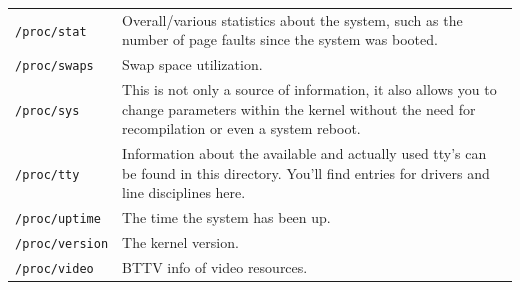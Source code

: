 \documentclass[a4paper]{article}
\begin{document}
\begin{table}
\begin{tabular}{@{}lp{8cm}@{}}
\texttt{/proc/stat} &
Overall/various statistics about the system, such as the number of page faults since the system was booted.\\

\texttt{/proc/swaps} &
Swap space utilization.\\

\texttt{/proc/sys} &
This is not only a source of information, it also allows you to change parameters within the kernel without the need for recompilation or even a system reboot.\\

\texttt{/proc/tty} &
Information about the available and actually used tty's can be found in this directory. You'll find entries for drivers and line disciplines here.\\

\texttt{/proc/uptime} &
The time the system has been up.\\

\texttt{/proc/version} &
The kernel version.\\

\texttt{/proc/video} &
BTTV info of video resources.\\
\bottomrule
\end{tabular}
\end{table}
\end{document}
